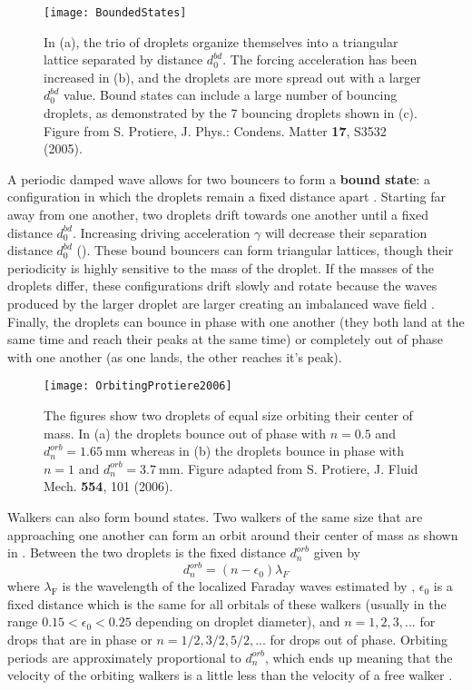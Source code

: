 \begin{figure}[h]
	       \centering
	    \texttt{[image: BoundedStates]}
	     \caption{In (a), the trio of droplets organize themselves into a triangular lattice separated by distance $d_{0}^{bd}$. The forcing acceleration has been increased in (b), and the droplets are more spread out with a larger $d_{0}^{bd}$ value. Bound states can include a large number of bouncing droplets, as demonstrated by the 7 bouncing droplets shown in (c).   
	    Figure from S. Protiere, J. Phys.: Condens. Matter \textbf{17}, S3532 (2005). 
	     }
	 \label{bounded}
	\end{figure}
            A periodic damped wave allows for two bouncers to form a \textbf{bound state}: a configuration in which the droplets remain a fixed distance apart .  Starting far away from one another, two droplets drift towards one another until a fixed distance $d_{0}^{bd}$. Increasing driving acceleration $\gamma$ will decrease their separation distance $d_{0}^{bd}$ (). These bound bouncers can form triangular lattices, though their periodicity is highly sensitive to the mass of the droplet. If the masses of the droplets differ, these configurations drift slowly and rotate because the waves produced by the larger droplet are larger creating an imbalanced wave field . Finally, the droplets can bounce in phase with one another (they both land at the same time and reach their peaks at the same time) or completely out of phase with one another (as one lands, the other reaches it's peak).
            
\begin{figure}[h]
	       \centering
	    \texttt{[image: OrbitingProtiere2006]}
	     \caption{ The figures show two droplets of equal size orbiting their center of mass. In (a) the droplets bounce out of phase with $n = 0.5$ and $d_{n}^{orb} =1.65~\mathrm{mm}$ whereas in (b) the droplets bounce in phase with  $n=1$ and  $d_{n}^{orb} = 3.7~\mathrm{mm}$.
	    Figure adapted from S. Protiere, J. Fluid Mech. \textbf{554}, 101 (2006). 
	     }
	 \label{orbiting}
	\end{figure}
 

            Walkers can also form bound states. Two walkers of the same size that are approaching one another can form an orbit around their center of mass as shown in . Between the two droplets is the fixed distance $d_{n}^{orb}$ given by          
\begin{equation} \label{orbital}
d_{n}^{orb} = (n - \epsilon_0)\lambda_F
\end{equation}         
where $\lambda_\mathrm{F}$ is the wavelength of the localized Faraday waves estimated by , $\epsilon_0$ is a fixed distance which is the same for all orbitals of these walkers (usually in the range $0.15 < \epsilon_0 < 0.25$ depending on droplet diameter), and $n = 1,2,3,...$ for drops that are in phase or $n = 1/2, 3/2, 5/2,...$ for drops out of phase. Orbiting periods are approximately proportional to $d_{n}^{orb}$, which ends up meaning that the velocity of the orbiting walkers is a little less than the velocity of a free walker . 


